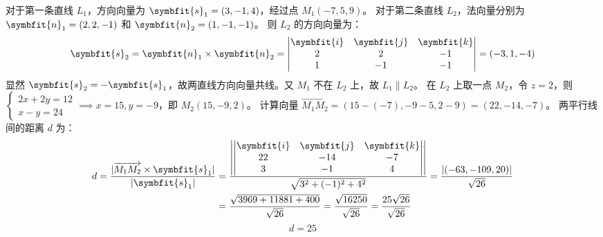 \begin{solution}
    对于第一条直线 $L_1$，方向向量为 $\symbfit{s}_1 = (3, -1, 4)$，经过点 $M_1(-7, 5, 9)$。
    对于第二条直线 $L_2$，法向量分别为 $\symbfit{n}_1 = (2, 2, -1)$ 和 $\symbfit{n}_2 = (1, -1, -1)$。
    则 $L_2$ 的方向向量为：
    \begin{equation*}
        \symbfit{s}_2 = \symbfit{n}_1 \times \symbfit{n}_2 = \begin{vmatrix} \symbfit{i} & \symbfit{j} & \symbfit{k} \\ 2 & 2 & -1 \\ 1 & -1 & -1 \end{vmatrix} = (-3, 1, -4)
    \end{equation*}
    显然 $\symbfit{s}_2 = - \symbfit{s}_1$，故两直线方向向量共线。又 $M_1$ 不在 $L_2$ 上，故 $L_1 \parallel L_2$。
    在 $L_2$ 上取一点 $M_2$，令 $z=2$，则 $\begin{cases} 2x+2y=12 \\ x-y=24 \end{cases} \implies x=15, y=-9$，即 $M_2(15, -9, 2)$。
    计算向量 $\overrightarrow{M_1 M_2} = (15 - (-7), -9 - 5, 2 - 9) = (22, -14, -7)$。
    两平行线间的距离 $d$ 为：
    \begin{equation*}
        \begin{aligned}
            d = \frac{|\overrightarrow{M_1 M_2} \times \symbfit{s}_1|}{|\symbfit{s}_1|} & = \frac{\left| \begin{vmatrix} \symbfit{i} & \symbfit{j} & \symbfit{k} \\ 22 & -14 & -7 \\ 3 & -1 & 4 \end{vmatrix} \right|}{\sqrt{3^2 + (-1)^2 + 4^2}} = \frac{|(-63, -109, 20)|}{\sqrt{26}} \\
                                                                                        & = \frac{\sqrt{3969 + 11881 + 400}}{\sqrt{26}} = \frac{\sqrt{16250}}{\sqrt{26}} = \frac{25\sqrt{26}}{\sqrt{26}}
        \end{aligned}
    \end{equation*}
    \begin{equation*}
        \boxed{d = 25}
    \end{equation*}
\end{solution}


